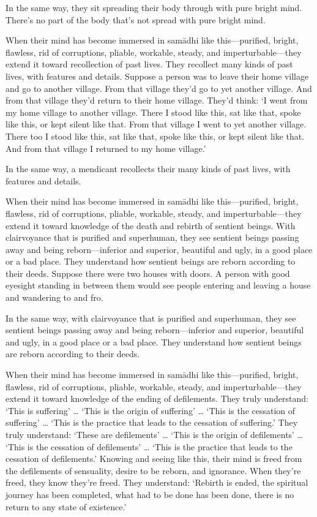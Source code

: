 \documentclass[12pt,openany]{book}%
\begin{document}
In the same way, they sit spreading their body through with pure bright mind. There’s no part of the body that’s not spread with pure bright mind. 

When their mind has become immersed in \textsanskrit{samādhi} like this—purified, bright, flawless, rid of corruptions, pliable, workable, steady, and imperturbable—they extend it toward recollection of past lives. They recollect many kinds of past lives, with features and details. Suppose a person was to leave their home village and go to another village. From that village they’d go to yet another village. And from that village they’d return to their home village. They’d think: ‘I went from my home village to another village. There I stood like this, sat like that, spoke like this, or kept silent like that. From that village I went to yet another village. There too I stood like this, sat like that, spoke like this, or kept silent like that. And from that village I returned to my home village.’ 

In the same way, a mendicant recollects their many kinds of past lives, with features and details. 

When their mind has become immersed in \textsanskrit{samādhi} like this—purified, bright, flawless, rid of corruptions, pliable, workable, steady, and imperturbable—they extend it toward knowledge of the death and rebirth of sentient beings. With clairvoyance that is purified and superhuman, they see sentient beings passing away and being reborn—inferior and superior, beautiful and ugly, in a good place or a bad place. They understand how sentient beings are reborn according to their deeds. Suppose there were two houses with doors. A person with good eyesight standing in between them would see people entering and leaving a house and wandering to and fro. 

In the same way, with clairvoyance that is purified and superhuman, they see sentient beings passing away and being reborn—inferior and superior, beautiful and ugly, in a good place or a bad place. They understand how sentient beings are reborn according to their deeds. 

When their mind has become immersed in \textsanskrit{samādhi} like this—purified, bright, flawless, rid of corruptions, pliable, workable, steady, and imperturbable—they extend it toward knowledge of the ending of defilements. They truly understand: ‘This is suffering’ … ‘This is the origin of suffering’ … ‘This is the cessation of suffering’ … ‘This is the practice that leads to the cessation of suffering.’ They truly understand: ‘These are defilements’ … ‘This is the origin of defilements’ … ‘This is the cessation of defilements’ … ‘This is the practice that leads to the cessation of defilements.’ Knowing and seeing like this, their mind is freed from the defilements of sensuality, desire to be reborn, and ignorance. When they’re freed, they know they’re freed. They understand: ‘Rebirth is ended, the spiritual journey has been completed, what had to be done has been done, there is no return to any state of existence.’ 
\end{document}

